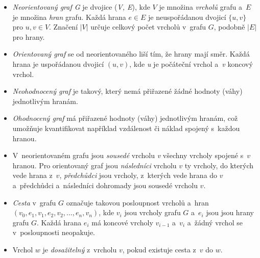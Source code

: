 \documentclass[12pt]{report}			%
\begin{document}
			\begin{itemize}
				\item \emph{Neorientovaný graf G} je dvojice (\emph{V, E}), kde $V$ je množina \emph{vrcholů} grafu a~$E$ je množina \emph{hran} grafu. Každá hrana $e \in E$ je neuspořádanou dvojicí $\{u,v\}$ pro $u,v \in V$. Značení $|V|$ určuje celkový počet vrcholů v~grafu $G$, podobně $|E|$ pro hrany.
				
				\item \emph{Orientovaný graf} se od neorientovaného liší tím, že hrany mají směr. Každá hrana je uspořádanou dvojicí $(u, v)$, kde \emph{u} je počáteční vrchol a~\emph{v} koncový vrchol.
				
				\item \emph{Neohodnocený graf} je takový, který nemá přiřazené žádné hodnoty (váhy) jednotlivým hranám.

				\item \emph{Ohodnocený graf} má přiřazené hodnoty (váhy) jednotlivým hranám, což umožňuje kvantifikovat například vzdálenost či náklad spojený s~každou hranou.
				
				\item V~neorientovaném grafu jsou \emph{sousedé} vrcholu \emph{v} všechny vrcholy spojené s~$v$ hranou. Pro orientovaný graf jsou \emph{následníci} vrcholu $v$ ty vrcholy, do kterých vede hrana z~$v$, \emph{předchůdci} jsou vrcholy, z~kterých vede hrana do $v$ a~předchůdci a~následníci dohromady jsou sousedé vrcholu $v$.
				\item \emph{Cesta} v~grafu $G$ označuje takovou posloupnost vrcholů a~hran \\$(v_0,e_1,v_1,e_2,v_2,\dots, e_n,v_n)$, kde $v_i$ jsou vrcholy grafu $G$ a~$e_i$ jsou jsou hrany grafu $G$. Každá hrana $e_i$ má koncové vrcholy $v_{i-1}$ a~$v_i$ a~žádný vrchol se v~posloupnosti neopakuje. 
				\item Vrchol $w$ je \emph{dosažitelný} z~vrcholu $v$, pokud existuje cesta z~$v$ do $w$.
			\end{itemize}
			
\end{document}
